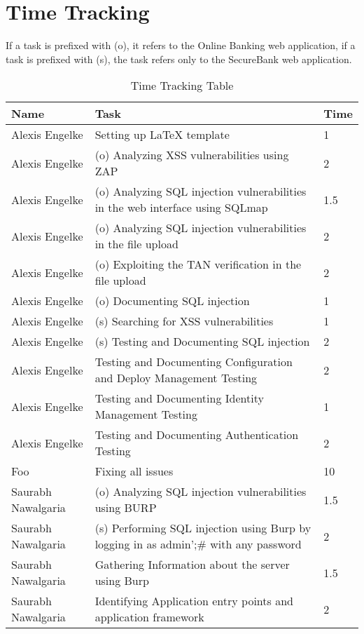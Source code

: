 \chapter{Time Tracking}\label{chapter:times}

If a task is prefixed with (o), it refers to the Online Banking web application, if a task is prefixed with (s), the task refers only to the SecureBank web application.

\begin{table}[htpb]
  \caption[Time Tracking Table]{Time Tracking Table}\label{tab:times}
  \centering
  \begin{tabular}{l p{8cm} l}
    \toprule
      Name & Task & Time \\
    \midrule
      Alexis Engelke & Setting up LaTeX template & 1 \\
      Alexis Engelke & (o) Analyzing XSS vulnerabilities using ZAP & 2 \\
      Alexis Engelke & (o) Analyzing SQL injection vulnerabilities in the web interface using SQLmap & 1.5 \\
      Alexis Engelke & (o) Analyzing SQL injection vulnerabilities in the file upload & 2 \\
      Alexis Engelke & (o) Exploiting the TAN verification in the file upload & 2 \\
      Alexis Engelke & (o) Documenting SQL injection & 1 \\
      Alexis Engelke & (s) Searching for XSS vulnerabilities & 1 \\
      Alexis Engelke & (s) Testing and Documenting SQL injection & 2 \\
      Alexis Engelke & Testing and Documenting Configuration and Deploy Management Testing & 2 \\
      Alexis Engelke & Testing and Documenting Identity Management Testing & 1 \\
      Alexis Engelke & Testing and Documenting Authentication Testing & 2 \\
      Foo & Fixing all issues & 10 \\
      Saurabh Nawalgaria & (o) Analyzing SQL injection vulnerabilities using BURP & 1.5 \\
      Saurabh Nawalgaria & (s) Performing SQL injection using Burp by logging in as admin';# with any password & 2 \\
      Saurabh Nawalgaria & Gathering Information about the server using Burp & 1.5 \\
      Saurabh Nawalgaria & Identifying Application entry points and application framework & 2 \\

\end{tabular}
\end{table}
